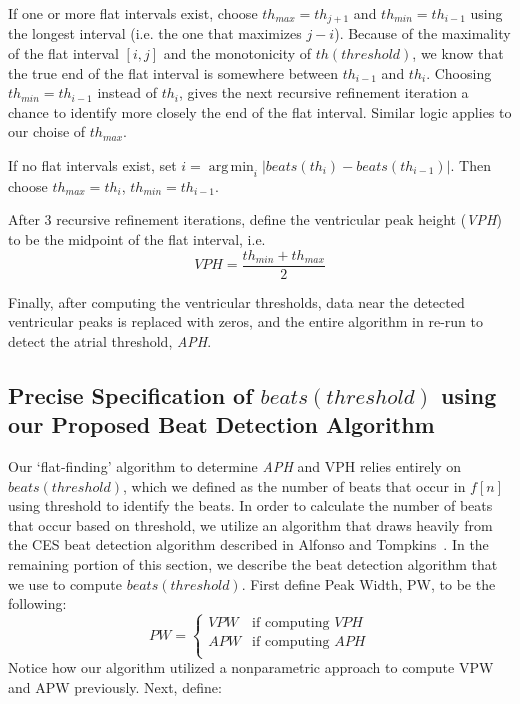 \documentclass[conference]{IEEEtran}
\newcommand{\APH}{\textit{APH}}
\newcommand{\VPH}{\textit{VPH}}
\DeclareMathOperator*{\argmin}{arg\,min}
\begin{document}
If one or more flat intervals exist, choose $th_{max} = th_{j+1}$ and $th_{min}=th_{i-1}$ using the longest interval (i.e. the one that maximizes $j-i$).
Because of the maximality of the flat interval $[i,j]$ and the monotonicity of $th(threshold)$, 
we know that the true end of the flat interval is somewhere between $th_{i-1}$ and $th_i$. 
Choosing $th_{min} = th_{i-1}$ instead of $th_{i}$, gives the next recursive refinement iteration a chance to identify more closely the end of the flat interval.
Similar logic applies to our choise of $th_{max}$.

If no flat intervals exist, set $i=\argmin_{i} |beats(th_i) - beats(th_{i-1})|$.
Then choose $th_{max} = th_i$, $th_{min} = th_{i-1}$.

After 3 recursive refinement iterations, define the ventricular peak height (\VPH{}) to be the midpoint of the flat interval, i.e.
\begin{equation*}
	VPH=\frac{th_{min}+th_{max}}{2}
\end{equation*}

Finally, after computing the ventricular thresholds,
data near the detected ventricular peaks is replaced with
zeros, and the entire algorithm in re-run to detect the
atrial threshold, \APH{}.

\subsection{Precise Specification of $beats(threshold)$ using our Proposed Beat Detection Algorithm}
Our `flat-finding' algorithm to determine \APH{} and
VPH relies entirely on $beats(threshold)$, which we
defined as the number of beats that occur in $f[n]$ using
threshold to identify the beats. In order to calculate the
number of beats that occur based on threshold, we utilize
an algorithm that draws heavily from the CES beat
detection algorithm described in Alfonso and Tompkins~\cite{realtime-qrs}.
In the remaining portion of this section, we describe
the beat detection algorithm that we use to compute
$beats(threshold)$.
First define Peak Width, PW, to be the following:
\begin{equation*}
	PW=\left\{ 
		\begin{array}{lr}
			VPW & \text{if computing } VPH \\
			APW & \text{if computing } APH \\
		\end{array} \right.
\end{equation*}
Notice how our algorithm utilized a nonparametric
approach to compute VPW and APW previously. Next,
define:
\end{document}
